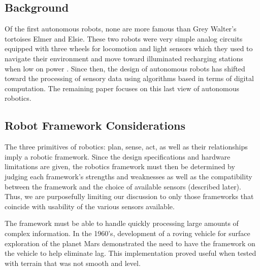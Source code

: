 









\subsection*{Background}
Of the first autonomous robots, none are more famous than Grey Walter's tortoises Elmer and Elsie. These two robots were very simple analog circuits equipped with three wheels for locomotion and light sensors which they used to navigate their environment and move toward illuminated recharging stations when low on power \cite{Walter:1950}. Since then, the design of autonomous robots has shifted toward the processing of sensory data using algorithms based in terms of digital computation. The remaining paper focuses on this last view of autonomous robotics.

\subsection*{Robot Framework Considerations}
The three primitives of robotics: plan, sense, act, as well as their relationships imply a robotic framework. Since the design specifications and hardware limitations are given, the robotics framework must then be determined by judging each framework's strengths and weaknesses as well as the compatibility between the framework and the choice of available sensors (described later). Thus, we are purposefully limiting our discussion to only those frameworks that coincide with usability of the various sensors available.

The framework must be able to handle quickly processing large amounts of complex information. In the 1960’s, development of a roving vehicle for surface exploration of the planet Mars demonstrated the need to have the framework on the vehicle to help eliminate lag. This implementation proved useful when tested with terrain that was not smooth and level. \cite{Hogle}

